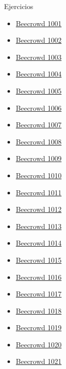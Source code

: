 \documentclass[12pt]{beamer}
\begin{document}
\begin{frame}{Ejercicios}
    \begin{multicols}{2}
        \begin{itemize}
            \item \href{https://judge.beecrowd.com/es/problems/view/1001}{Beecrowd 1001}
            \item \href{https://judge.beecrowd.com/es/problems/view/1002}{Beecrowd 1002}
            \item \href{https://judge.beecrowd.com/es/problems/view/1003}{Beecrowd 1003}
            \item \href{https://judge.beecrowd.com/es/problems/view/1004}{Beecrowd 1004}
            \item \href{https://judge.beecrowd.com/es/problems/view/1005}{Beecrowd 1005}
            \item \href{https://judge.beecrowd.com/es/problems/view/1006}{Beecrowd 1006}
            \item \href{https://judge.beecrowd.com/es/problems/view/1007}{Beecrowd 1007}
            \item \href{https://judge.beecrowd.com/es/problems/view/1008}{Beecrowd 1008}
            \item \href{https://judge.beecrowd.com/es/problems/view/1009}{Beecrowd 1009}
            \item \href{https://judge.beecrowd.com/es/problems/view/1010}{Beecrowd 1010}
            \item \href{https://judge.beecrowd.com/es/problems/view/1011}{Beecrowd 1011}
            \item \href{https://judge.beecrowd.com/es/problems/view/1012}{Beecrowd 1012}
            \item \href{https://judge.beecrowd.com/es/problems/view/1013}{Beecrowd 1013}
            \item \href{https://judge.beecrowd.com/es/problems/view/1014}{Beecrowd 1014}
            \item \href{https://judge.beecrowd.com/es/problems/view/1015}{Beecrowd 1015}
            \item \href{https://judge.beecrowd.com/es/problems/view/1016}{Beecrowd 1016}
            \item \href{https://judge.beecrowd.com/es/problems/view/1017}{Beecrowd 1017}
            \item \href{https://judge.beecrowd.com/es/problems/view/1018}{Beecrowd 1018}
            \item \href{https://judge.beecrowd.com/es/problems/view/1019}{Beecrowd 1019}
            \item \href{https://judge.beecrowd.com/es/problems/view/1020}{Beecrowd 1020}
            \item \href{https://judge.beecrowd.com/es/problems/view/1021}{Beecrowd 1021}
        \end{itemize}
    \end{multicols}
\end{frame}
\end{document}
